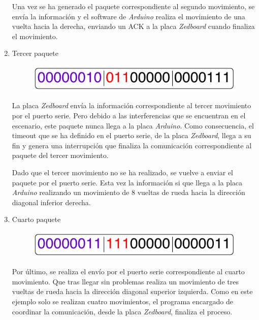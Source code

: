 \begin{enumerate}
Una vez se ha generado el paquete correspondiente al segundo movimiento, se envía la información y el software de \emph{Arduino} realiza el movimiento de una vuelta hacia la derecha, enviando un ACK a la placa \emph{Zedboard} cuando finaliza el movimiento. 


\item Tercer paquete
\begin{figure}[hbtp]
\centering
	\includegraphics[width=.9\textwidth]{./figures/Comunicacion3.pdf}
	\label{fig:Comunicacion1}
\end{figure}

La placa \emph{Zedboard} envía la información correspondiente al tercer movimiento por el puerto serie. Pero debido a las interferencias que se encuentran en el escenario, este paquete nunca llega a la placa \emph{Arduino}. Como consecuencia, el timeout que se ha definido en el puerto serie, de la placa \emph{Zedboard}, llega a su fin y genera una interrupción que finaliza la comunicación correspondiente al paquete del tercer movimiento.

Dado que el tercer movimiento no se ha realizado, se vuelve a enviar el paquete por el puerto serie. Esta vez la información si que llega a la placa \emph{Arduino} realizando un movimiento de 8 vueltas de rueda hacia la dirección diagonal inferior derecha.


\item Cuarto paquete
\begin{figure}[hbtp]
\centering
	\includegraphics[width=.9\textwidth]{./figures/Comunicacion4.pdf}
	\label{fig:Comunicacion1}
\end{figure}

Por último, se realiza el envío por el puerto serie correspondiente al cuarto movimiento. Que tras llegar sin problemas realiza un movimiento de tres vueltas de rueda hacia la dirección diagonal superior izquierda. Como en este ejemplo solo se realizan cuatro movimientos, el programa encargado de coordinar la comunicación, desde la placa \emph{Zedboard}, finaliza el proceso.


\end{enumerate} %

